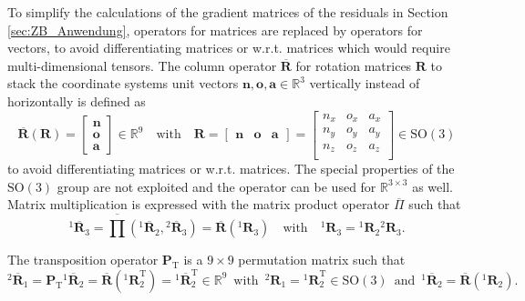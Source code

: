 \documentclass[robotics,article,accept,moreauthors,pdftex]{Definitions/mdpi}
\newcommand{\bm}[1]{\boldsymbol{#1}}
\newcommand{\rotmat}[2]{{{ }^{#1}\boldsymbol{R}}_{#2}}
\newcommand{\rotmato}[2]{{{ }^{#1}\boldsymbol{\overline{R}}}_{#2}}
\newcommand{\transp}[0]{{\mathrm{T}}}
\begin{document}
To simplify the calculations of the gradient matrices of the residuals in Section\,\ref{sec:ZB_Anwendung}, operators for matrices are replaced by operators for vectors, to avoid differentiating matrices or w.r.t. matrices which would require multi-dimensional tensors.
The column operator $\overline{\bm{R}}$ for rotation matrices $\bm{R}$ to stack the coordinate systems unit vectors $\bm{n},\bm{o},\bm{a} \in {\mathbb{R}}^{3}$ vertically instead of horizontally is defined as
%
\begin{equation}
\overline{\bm{R}}(\bm{R})=\begin{bmatrix}
\bm{n} \\ \bm{o} \\ \bm{a}
\end{bmatrix} \in {\mathbb{R}}^{9}
\quad
\mathrm{with}
\quad
\bm{R}=\begin{bmatrix}
\bm{n} & \bm{o} & \bm{a}
\end{bmatrix}
=
\begin{bmatrix}
{n_x}&{o_x}&{a_x} \\
{n_y}&{o_y}&{a_y} \\ 
{n_z}&{o_z}&{a_z} \\ 
\end{bmatrix}
\in \mathrm{SO}(3)
\label{equ:def_rotmat}
\end{equation}
%
to avoid differentiating matrices or w.r.t. matrices.
The special properties of the $\mathrm{SO}(3)$ group are not exploited and the operator can be used for ${\mathbb{R}}^{3\times3}$ as well.
Matrix multiplication is expressed with the matrix product operator $\overline{\Pi}$
%
such that
%
\begin{equation}
\rotmato{1}{3}
=
\overline{\prod}\left( \rotmato{1}{2}, \rotmato{2}{3}\right)
=
\overline{\bm{R}}(\rotmat{1}{3})
\quad
\mathrm{with}
\quad
\rotmat{1}{3}
=
\rotmat{1}{2}
\rotmat{2}{3}.
\label{equ:matprod}
\end{equation}
%

The transposition operator $\bm{P}_\transp$ is a $9 \times 9$ permutation matrix such that
%
\begin{equation}
\rotmato{2}{1}
=
\bm{P}_\transp \rotmato{1}{2}
=
\overline{\bm{R}}(\rotmat{1}{2}^\transp)
=
\rotmato{1}{2}^\transp
\in {\mathbb{R}}^{9}
\enspace
\mathrm{with}
\enspace
\rotmat{2}{1}
=
\rotmat{1}{2}^\transp
\in \mathrm{SO}(3)
\enspace
\mathrm{and}
\enspace
\rotmato{1}{2}=\overline{\bm{R}}(\rotmat{1}{2})
.
\label{equ:transposition_operator}
\end{equation}
%
\end{document}
